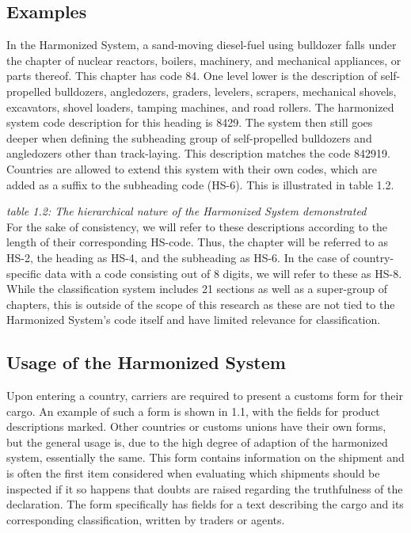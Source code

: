 \subsection{Examples}
In the Harmonized System, a sand-moving diesel-fuel using bulldozer falls under the chapter of nuclear reactors, boilers, machinery, and mechanical appliances, or parts thereof. This chapter has code 84. One level lower is the description of self-propelled bulldozers, angledozers, graders, levelers, scrapers, mechanical shovels, excavators, shovel loaders, tamping machines, and road rollers. The harmonized system code description for this heading is 8429. The system then still goes deeper when defining the subheading group of self-propelled bulldozers and angledozers other than track-laying. This description matches the code 842919. Countries are allowed to extend this system with their own codes, which are added as a suffix to the subheading code (HS-6). This is illustrated in table 1.2.

\begin{center}
    
\end{center}
{\textit{table 1.2: The hierarchical nature of the Harmonized System demonstrated}} \\

For the sake of consistency, we will refer to these descriptions according to the length of their corresponding HS-code. Thus, the chapter will be referred to as HS-2, the heading as HS-4, and the subheading as HS-6. In the case of country-specific data with a code consisting out of 8 digits, we will refer to these as HS-8. While the classification system includes 21 sections as well as a super-group of chapters, this is outside of the scope of this research as these are not tied to the Harmonized System’s code itself and have limited relevance for classification.

\subsection{Usage of the Harmonized System}
Upon entering a country, carriers are required to present a customs form for their cargo. An example of such a form is shown in 1.1, with the fields for product descriptions marked. Other countries or customs unions have their own forms, but the general usage is, due to the high degree of adaption of the harmonized system, essentially the same. This form contains information on the shipment and is often the first item considered when evaluating which shipments should be inspected if it so happens that doubts are raised regarding the truthfulness of the declaration. The form specifically has fields for a text describing the cargo and its corresponding classification, written by traders or agents.
\\

